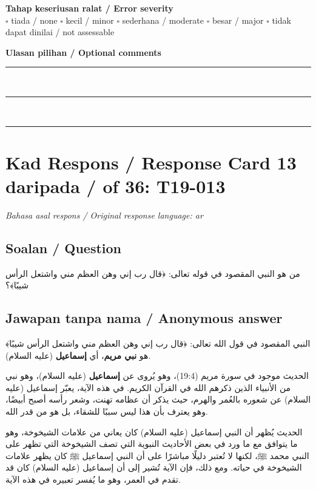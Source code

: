\documentclass[11pt,a4paper]{article}
\newcommand{\ar}[1]{{\arabicfont #1}}
\begin{document}
\medskip
\textbf{Tahap keseriusan ralat / Error severity}\\
$\square$ tiada / none \quad $\square$ kecil / minor \quad $\square$ sederhana / moderate \quad
$\square$ besar / major \quad $\square$ tidak dapat dinilai / not assessable

\medskip
\textbf{Ulasan pilihan / Optional comments}\\[3pt]
\rule{\textwidth}{0.4pt}\\[16pt]
\rule{\textwidth}{0.4pt}\\[16pt]
\rule{\textwidth}{0.4pt}

\newpage
\section*{Kad Respons / Response Card 13 daripada / of 36: T19-013}
\textit{Bahasa asal respons / Original response language: ar}

\subsection*{Soalan / Question}
\ar{من} \ar{هو} \ar{النبي} \ar{المقصود} \ar{في} \ar{قوله} \ar{تعالى}: \ar{﴿قال} \ar{رب} \ar{إني} \ar{وهن} \ar{العظم} \ar{مني} \ar{واشتعل} \ar{الرأس} \ar{شيبًا﴾؟}

\subsection*{Jawapan tanpa nama / Anonymous answer}
\ar{النبي} \ar{المقصود} \ar{في} \ar{قول} \ar{الله} \ar{تعالى}: \ar{﴿قال} \ar{رب} \ar{إني} \ar{وهن} \ar{العظم} \ar{مني} \ar{واشتعل} \ar{الرأس} \ar{شيبًا﴾} \ar{هو} \textbf{\ar{نبي} \ar{مريم}}\ar{،} \ar{أي} \textbf{\ar{إسماعيل}} (\ar{عليه} \ar{السلام}).\par\medskip \ar{هذا} \ar{الحديث} \ar{موجود} \ar{في} \ar{سورة} \ar{مريم} (19:4)\ar{،} \ar{وهو} \ar{يُروى} \ar{عن} \textbf{\ar{إسماعيل}} (\ar{عليه} \ar{السلام})\ar{،} \ar{وهو} \ar{نبي} \ar{من} \ar{الأنبياء} \ar{الذين} \ar{ذكرهم} \ar{الله} \ar{في} \ar{القرآن} \ar{الكريم}. \ar{في} \ar{هذه} \ar{الآية،} \ar{يعبّر} \ar{إسماعيل} (\ar{عليه} \ar{السلام}) \ar{عن} \ar{شعوره} \ar{بالعُمر} \ar{والهرم،} \ar{حيث} \ar{يذكر} \ar{أن} \ar{عظامه} \ar{تهنت،} \ar{وشعر} \ar{رأسه} \ar{أصبح} \ar{أبيضًا،} \ar{وهو} \ar{يعترف} \ar{بأن} \ar{هذا} \ar{ليس} \ar{سببًا} \ar{للشقاء،} \ar{بل} \ar{هو} \ar{من} \ar{قدر} \ar{الله}.\par\medskip \ar{هذا} \ar{الحديث} \ar{يُظهر} \ar{أن} \ar{النبي} \ar{إسماعيل} (\ar{عليه} \ar{السلام}) \ar{كان} \ar{يعاني} \ar{من} \ar{علامات} \ar{الشيخوخة،} \ar{وهو} \ar{ما} \ar{يتوافق} \ar{مع} \ar{ما} \ar{ورد} \ar{في} \ar{بعض} \ar{الأحاديث} \ar{النبوية} \ar{التي} \ar{تصف} \ar{الشيخوخة} \ar{التي} \ar{تظهر} \ar{على} \ar{النبي} \ar{محمد} \ar{ﷺ،} \ar{لكنها} \ar{لا} \ar{تُعتبر} \ar{دليلًا} \ar{مباشرًا} \ar{على} \ar{أن} \ar{النبي} \ar{إسماعيل} \ar{ﷺ} \ar{كان} \ar{يظهر} \ar{علامات} \ar{الشيخوخة} \ar{في} \ar{حياته}. \ar{ومع} \ar{ذلك،} \ar{فإن} \ar{الآية} \ar{تُشير} \ar{إلى} \ar{أن} \ar{إسماعيل} (\ar{عليه} \ar{السلام}) \ar{كان} \ar{قد} \ar{تقدم} \ar{في} \ar{العمر،} \ar{وهو} \ar{ما} \ar{يُفسر} \ar{تعبيره} \ar{في} \ar{هذه} \ar{الآية}.
\end{document}
